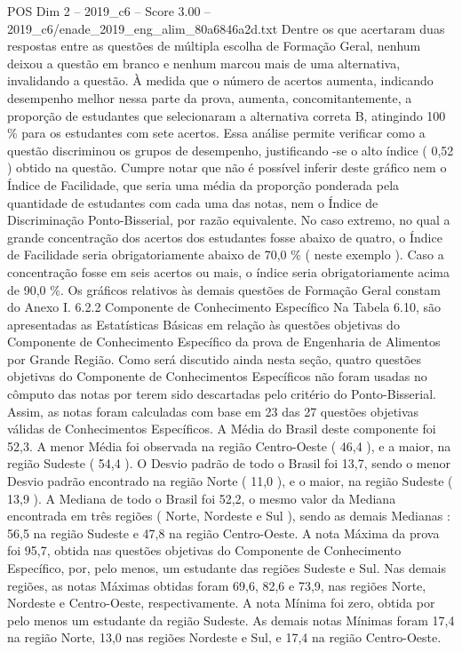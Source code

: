 \begin{textsample}{POS Dim 2 – 2019\_c6 – Score 3.00 – 2019\_c6/enade\_2019\_eng\_alim\_80a6846a2d.txt}
Dentre os que acertaram duas respostas entre as questões de múltipla escolha de Formação Geral, nenhum deixou a questão em branco e nenhum marcou mais de uma alternativa, invalidando a questão.
À medida que o número de acertos aumenta, indicando desempenho melhor nessa parte da prova, aumenta, concomitantemente, a proporção de estudantes que selecionaram a alternativa correta B, atingindo 100 \% para os estudantes com sete acertos.
Essa análise permite verificar como a questão discriminou os grupos de desempenho, justificando -se o alto índice ( 0,52 ) obtido na questão.
Cumpre notar que não é possível inferir deste gráfico nem o Índice de Facilidade, que seria uma média da proporção ponderada pela quantidade de estudantes com cada uma das notas, nem o Índice de Discriminação Ponto-Bisserial, por razão equivalente.
No caso extremo, no qual a grande concentração dos acertos dos estudantes fosse abaixo de quatro, o Índice de Facilidade seria obrigatoriamente abaixo de 70,0 \% ( neste exemplo ).
Caso a concentração fosse em seis acertos ou mais, o índice seria obrigatoriamente acima de 90,0 \%.
Os gráficos relativos às demais questões de Formação Geral constam do Anexo I. 6.2.2 Componente de Conhecimento Específico Na Tabela 6.10, são apresentadas as Estatísticas Básicas em relação às questões objetivas do Componente de Conhecimento Específico da prova de Engenharia de Alimentos por Grande Região.
Como será discutido ainda nesta seção, quatro questões objetivas do Componente de Conhecimentos Específicos não foram usadas no cômputo das notas por terem sido descartadas pelo critério do Ponto-Bisserial.
Assim, as notas foram calculadas com base em 23 das 27 questões objetivas válidas de Conhecimentos Específicos.
A Média do Brasil deste componente foi 52,3.
A menor Média foi observada na região Centro-Oeste ( 46,4 ), e a maior, na região Sudeste ( 54,4 ).
O Desvio padrão de todo o Brasil foi 13,7, sendo o menor Desvio padrão encontrado na região Norte ( 11,0 ), e o maior, na região Sudeste ( 13,9 ).
A Mediana de todo o Brasil foi 52,2, o mesmo valor da Mediana encontrada em três regiões ( Norte, Nordeste e Sul ), sendo as demais Medianas : 56,5 na região Sudeste e 47,8 na região Centro-Oeste.
A nota Máxima da prova foi 95,7, obtida nas questões objetivas do Componente de Conhecimento Específico, por, pelo menos, um estudante das regiões Sudeste e Sul.
Nas demais regiões, as notas Máximas obtidas foram 69,6, 82,6 e 73,9, nas regiões Norte, Nordeste e Centro-Oeste, respectivamente.
A nota Mínima foi zero, obtida por pelo menos um estudante da região Sudeste.
As demais notas Mínimas foram 17,4 na região Norte, 13,0 nas regiões Nordeste e Sul, e 17,4 na região Centro-Oeste.

\end{textsample}
